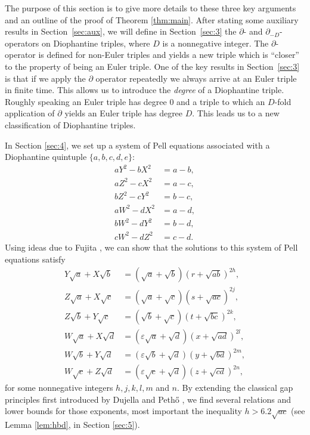\documentclass{amsart}
\theoremstyle{definition}
\begin{document}
The purpose of this section is to give more details to these three key arguments and an outline of the proof of Theorem \ref{thm:main}. After stating some auxiliary results in Section~\ref{sec:aux}, we will define in Section~\ref{sec:3} the $\partial$- and $\partial_{-D}$-operators on Diophantine triples,
where $D$ is a nonnegative integer. The $\partial$-operator is defined for non-Euler triples and yields a new triple which is ``closer'' to the property of being an Euler triple. One of the key results in Section~\ref{sec:3} is that if we apply the $\partial$ operator repeatedly we always arrive at an Euler triple in finite time. This allows us to introduce the \emph{degree} of a Diophantine triple. Roughly speaking an Euler triple has degree $0$ and a triple to which an $D$-fold application of $\partial$ yields an Euler triple has degree $D$. This leads us to a new classification of Diophantine triples. 

In Section \ref{sec:4}, we set up a system of Pell equations associated with a Diophantine quintuple $\{a, b, c, d, e\}$:
\begin{align*}
aY^2 - bX^2 &= a - b,\\
aZ^2 - cX^2 &= a - c,\\
bZ^2 - cY^2 &= b - c,\\
aW^2 - dX^2 &= a - d,\\
bW^2 - dY^2 &= b - d,\\
cW^2 - dZ^2 &= c - d. 
\end{align*}
Using ideas due to Fujita \cite{Fujita-number},  we can show that the solutions to this system of Pell equations satisfy
\begin{align*}
Y \sqrt{a} + X \sqrt{b} &= (\sqrt{a} + \sqrt{b})(r+\sqrt{ab})^{2h},\\
Z \sqrt{a} + X \sqrt{c} &= ( \sqrt{a} + \sqrt{c})(s+\sqrt{ac})^{2j},\\
Z \sqrt{b} + Y \sqrt{c} &= (\sqrt{b} +  \sqrt{c})(t+\sqrt{bc})^{2k},\\
W \sqrt{a} + X \sqrt{d} &= (\varepsilon \sqrt{a} + \sqrt{d})(x+\sqrt{ad})^{2l},\\
W \sqrt{b} + Y \sqrt{d} &= (\varepsilon \sqrt{b} + \sqrt{d})(y+\sqrt{bd})^{2m},\\
W \sqrt{c} + Z \sqrt{d} &= (\varepsilon \sqrt{c} +  \sqrt{d})(z+\sqrt{cd})^{2n},
\end{align*}
for some nonnegative integers $h, j, k, l, m$ and $n$. By extending the classical gap principles first introduced by Dujella and Peth\H{o} \cite{Dujella-Pethoe:1998}, we find several relations and lower bounds for those exponents, most important the inequality $h>6.2 \sqrt{ac}$ (see Lemma \ref{lem:hbd}, in Section \ref{sec:5}).
\end{document}
